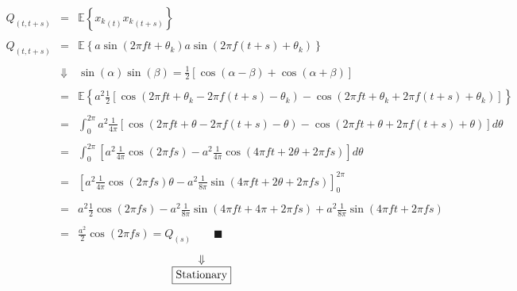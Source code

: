 \documentclass[11pt, a4paper]{article}
\begin{document}
\begin{equation}
    \begin{array}{rcl}
        Q_{\left(t,t+s\right)} & = & \displaystyle \mathbb{E}\left\{{x_k}_{\left(t\right)}{x_k}_{\left(t+s\right)}\right\} \\\\
        Q_{\left(t,t+s\right)} & = & \displaystyle \mathbb{E}\left\{a\sin{\left(2\pi ft+\theta_k\right)}a\sin{\left(2\pi f\left(t+s\right)+\theta_k\right)}\right\} \\\\
        & \Downarrow & \displaystyle \sin{\left(\alpha\right)}\sin{\left(\beta\right)}=\frac{1}{2}\left[\cos\left(\alpha-\beta\right)+\cos\left(\alpha+\beta\right)\right] \\\\
        & = & \displaystyle \mathbb{E}\left\{a^2\frac{1}{2}\left[\cos\left(2\pi ft+\theta_k-2\pi f\left(t+s\right)-\theta_k\right)-\cos\left(2\pi ft+\theta_k+2\pi f\left(t+s\right)+\theta_k\right)\right]\right\} \\\\
        & = & \displaystyle \int_{0}^{2\pi}{a^2\frac{1}{4\pi}\left[\cos\left(2\pi ft+\theta-2\pi f\left(t+s\right)-\theta\right)-\cos\left(2\pi ft+\theta+2\pi f\left(t+s\right)+\theta\right)\right]d\theta} \\\\
        & = & \displaystyle \int_{0}^{2\pi}{\left[a^2\frac{1}{4\pi}\cos\left(2\pi fs\right)-a^2\frac{1}{4\pi}\cos\left(4\pi ft+2\theta+2\pi fs\right)\right]d\theta} \\\\
        & = & \displaystyle \left[a^2\frac{1}{4\pi}\cos\left(2\pi fs\right)\theta-a^2\frac{1}{8\pi}\sin\left(4\pi ft+2\theta+2\pi fs\right)\right]_0^{2\pi} \\\\
        & = & \displaystyle a^2\frac{1}{2}\cos\left(2\pi fs\right)-a^2\frac{1}{8\pi}\sin\left(4\pi ft+4\pi+2\pi fs\right)+a^2\frac{1}{8\pi}\sin\left(4\pi ft+2\pi fs\right) \\\\
        & = & \displaystyle \frac{a^2}{2}\cos\left(2\pi fs\right)=Q_{\left(s\right)}\qquad\blacksquare
    \end{array}
\end{equation}
\begin{equation*}
    \begin{array}{c}
        \Downarrow \\
        \boxed{$\text{Stationary}$}
    \end{array}
\end{equation*}
\end{document}
